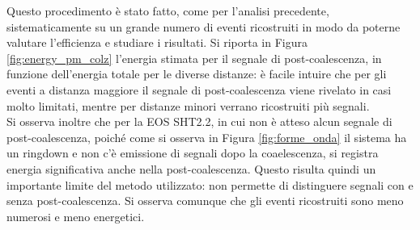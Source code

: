 Questo procedimento è stato fatto, come per l'analisi precedente, sistematicamente su un grande numero di eventi ricostruiti in modo da poterne valutare l'efficienza e studiare i risultati. Si riporta in Figura \ref{fig:energy_pm_colz} l'energia stimata per il segnale di post-coalescenza, in funzione dell'energia totale per le diverse distanze: è facile intuire che per gli eventi a distanza maggiore il segnale di post-coalescenza viene rivelato in casi molto limitati, mentre per distanze minori verrano ricostruiti più segnali.\\
Si osserva inoltre che per la EOS SHT2.2, in cui non è atteso alcun segnale di post-coalescenza, poiché come si osserva in Figura \ref{fig:forme_onda} il sistema ha un ringdown e non c'è emissione di segnali dopo la coaelescenza, si registra energia significativa anche nella post-coalescenza. Questo risulta quindi un importante limite del metodo utilizzato: non permette di distinguere segnali con e senza post-coalescenza. Si osserva comunque che gli eventi ricostruiti sono meno numerosi e meno energetici.
